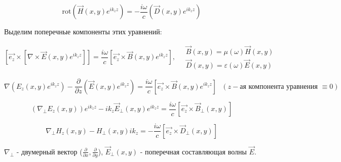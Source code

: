 \documentclass[12pt, a4paper]{report}
\begin{document}
\[ \mathrm{rot } (\vec{H } (x,y )e^{i k_z z}) = -\frac{i \omega }{c } ( \vec{D} (x,y ) e^{ i k_z z} )  \] 

Выделим поперечные компоненты этих уравнений: 

\[[ \vec{e_{z} } \times [ \nabla \times  \vec{E } (x,y ) e^{i k_z z} ]] = \frac{i \omega }{c } [ \vec{e_z } \times  \vec{B } (x,y) e^{ i k_z z}  ]  , \quad  \begin{aligned}
    \vec{B } (x,y ) = \mu(\omega ) \vec{H}(x,y ) \\ 
    \vec{D} (x,y ) = \varepsilon(\omega ) \vec{E}(x,y )
\end{aligned}    \] 

\[ \nabla (E_z (x,y ) e^{ i k_z z } ) - \frac{\partial}{\partial z} (\vec{E } (x,y )e^{i k_z z} ) = \frac{i \omega }{c } [\vec{e_z} \times \vec{B } (x,y ) e^{ i k_z z} ]\text{  }  (z-\text{ая компонента уравнения } \equiv 0)  \] 

\[ (\nabla_{\perp } E_z (x,y ) ) e^{i k_z z} - i k_z \vec{E } _{ \perp } (x,y ) e^{i k_z z} =   \frac{ i \omega }{c } [ \vec{e_z} \times  \vec{B} _{ \perp } (x,y ) ]     \] 

\[ \nabla_{ \perp } H_z (x,y )- H_{ \perp } (x,y ) i k_z = - \frac{ i\omega }{c } [\vec{e_z}\times \vec{D } _{\perp  } (x,y)  ] \] 

\( \nabla_{ \perp }  \) - двумерный вектор (\( \frac{\partial}{\partial  x},\frac{\partial}{\partial y}   \)), \( \vec{E}_{ \perp } (x,y) \) - поперечная составляющая волны \( \vec{E }  \).


\ifdefined\mainfile
\else
    
\end{document}
